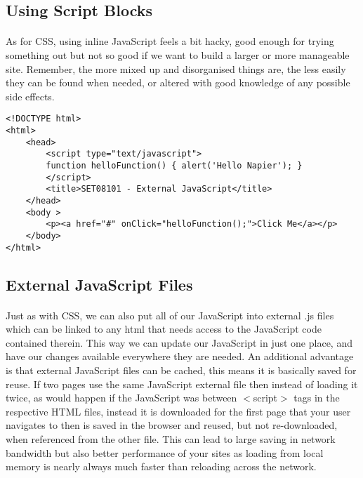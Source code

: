 \documentclass[10pt, a4paper]{article}
\begin{document}
\subsection{Using Script Blocks}
\paragraph{} As for CSS, using inline JavaScript feels a bit hacky, good enough for trying something out but not so good if we want to build a larger or more manageable site. Remember, the more mixed up and disorganised things are, the less easily they can be found when needed, or altered with good knowledge of any possible side effects.


\begin{lstlisting}
<!DOCTYPE html>
<html>
    <head>
        <script type="text/javascript">
        function helloFunction() { alert('Hello Napier'); }
        </script>
        <title>SET08101 - External JavaScript</title>
    </head>
    <body >
        <p><a href="#" onClick="helloFunction();">Click Me</a></p>
    </body>
</html>
\end{lstlisting}

\subsection{External JavaScript Files}

\paragraph{} Just as with CSS, we can also put all of our JavaScript into external .js files which can be linked to any html that needs access to the JavaScript code contained therein. This way we can update our JavaScript in just one place, and have our changes available everywhere they are needed. An additional advantage is that external JavaScript files can be cached, this means it is basically saved for reuse. If two pages use the same JavaScript external file then instead of loading it twice, as would happen if the JavaScript was between $<$script$>$ tags in the respective HTML files, instead it is downloaded for the first page that your user navigates to then is saved in the browser and reused, but not re-downloaded, when referenced from the other file. This can lead to large saving in network bandwidth but also better performance of your sites as loading from local memory is nearly always much faster than reloading across the network. 
\end{document}
